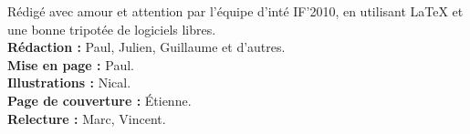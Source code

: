 





\tableofcontents
\begin{multicols}{2}
{
    \begin{center}
\footnotesize
Rédigé avec amour et attention par l'équipe d'inté IF'2010, en utilisant
\LaTeX{} et une bonne tripotée de logiciels libres. \\
\textbf{Rédaction : }Paul, Julien, Guillaume et d'autres.\\
\textbf{Mise en page : }Paul.\\
\textbf{Illustrations :} Nical.\\
\textbf{Page de couverture :} Étienne.\\
\textbf{Relecture :} Marc, Vincent.\\
\normalsize
\cc \ccby \ccnc \ccsa
\end{center}
}
\end{multicols}

